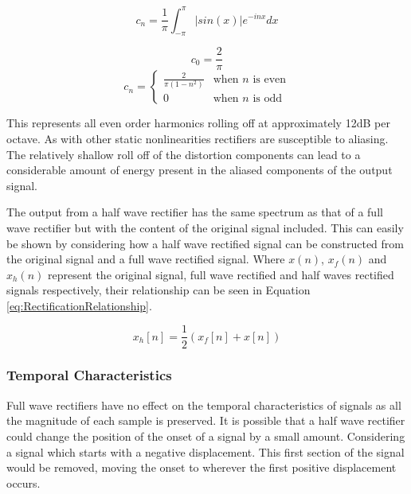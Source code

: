 			\[ c_{n} = \frac{1}{\pi} \int_{-\pi}^{\pi} |sin(x)|e^{-inx} dx \]

			\[ c_{0} = \frac{2}{\pi} \]
			\begin{equation}
				c_{n} = \begin{cases}
					\frac{2}{\pi(1 - n^{2})} & \text{when $n$ is even} \\
					0 & \text{when $n$ is odd}
				\end{cases}
				\label{eq:RectificationFourier}
			\end{equation}

			This represents all even order harmonics rolling off at approximately 12dB per octave.  As with
			other static nonlinearities rectifiers are susceptible to aliasing. The relatively shallow roll off
			of the distortion components can lead to a considerable amount of energy present in the aliased
			components of the output signal. 

			The output from a half wave rectifier has the same spectrum as that of a full wave rectifier
			but with the content of the original signal included. This can easily be shown by considering how a
			half wave rectified signal can be constructed from the original signal and a full wave rectified
			signal. Where $x(n)$, $x_{f}(n)$ and $x_{h}(n)$ represent the original signal, full wave rectified
			and half waves rectified signals respectively, their relationship can be seen in Equation
			\ref{eq:RectificationRelationship}.

			\begin{equation}
				x_{h}[n] = \frac{1}{2} \left( x_{f}[n] + x[n] \right)
				\label{eq:RectificationRelationship}
			\end{equation}

		\subsubsection*{Temporal Characteristics}
			Full wave rectifiers have no effect on the temporal characteristics of signals as all the magnitude
			of each sample is preserved. It is possible that a half wave rectifier could change the position of
			the onset of a signal by a small amount. Considering a signal which starts with a negative
			displacement. This first section of the signal would be removed, moving the onset to wherever the
			first positive displacement occurs.
			

